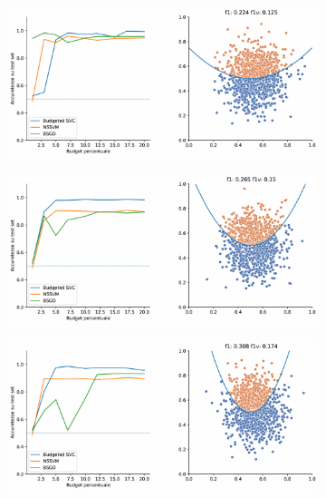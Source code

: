 \begin{appendices}
\begin{figure}[b!]
\centering
    \begin{subfigure}{.8\textwidth}
        \centering
        \includegraphics[width=\textwidth]{img/comp_new/1.pdf}
    \end{subfigure}
    \hfill
    \begin{subfigure}{.8\textwidth}
        \centering
        \includegraphics[width=\textwidth]{img/comp_new/2.pdf}
    \end{subfigure}
    \hfill
    \begin{subfigure}{.8\textwidth}
        \centering
        \includegraphics[width=\textwidth]{img/comp_new/3.pdf}
    \end{subfigure}

\end{figure}
\end{appendices}
